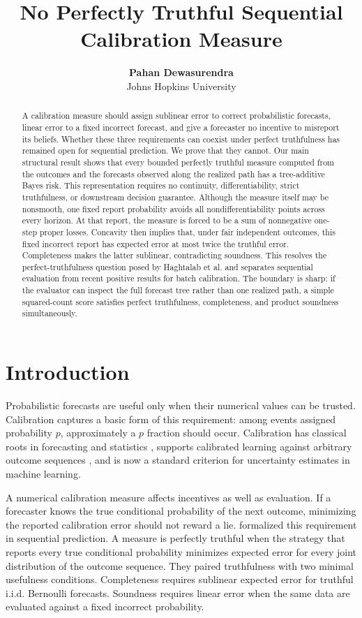 \documentclass{article}
\title{No Perfectly Truthful Sequential Calibration Measure}
\author{\textbf{Pahan Dewasurendra} \\ Johns Hopkins University}
\theoremstyle{definition}
\theoremstyle{remark}
\newcommand{\1}{\mathbf 1}
\begin{document}
\maketitle

\begin{abstract}
A calibration measure should assign sublinear error to correct probabilistic forecasts, linear error to a fixed incorrect forecast, and give a forecaster no incentive to misreport its beliefs. Whether these three requirements can coexist under perfect truthfulness has remained open for sequential prediction. We prove that they cannot. Our main structural result shows that every bounded perfectly truthful measure computed from the outcomes and the forecasts observed along the realized path has a tree-additive Bayes risk. This representation requires no continuity, differentiability, strict truthfulness, or downstream decision guarantee. Although the measure itself may be nonsmooth, one fixed report probability avoids all nondifferentiability points across every horizon. At that report, the measure is forced to be a sum of nonnegative one-step proper losses. Concavity then implies that, under fair independent outcomes, this fixed incorrect report has expected error at most twice the truthful error. Completeness makes the latter sublinear, contradicting soundness. This resolves the perfect-truthfulness question posed by Haghtalab et al. and separates sequential evaluation from recent positive results for batch calibration. The boundary is sharp: if the evaluator can inspect the full forecast tree rather than one realized path, a simple squared-count score satisfies perfect truthfulness, completeness, and product soundness simultaneously.
\end{abstract}

\section{Introduction}

Probabilistic forecasts are useful only when their numerical values can be trusted. Calibration captures a basic form of this requirement: among events assigned probability \(p\), approximately a \(p\) fraction should occur. Calibration has classical roots in forecasting and statistics \citep{brier1950verification,dawid1982well}, supports calibrated learning against arbitrary outcome sequences \citep{foster1998asymptotic}, and is now a standard criterion for uncertainty estimates in machine learning.

A numerical calibration measure affects incentives as well as evaluation. If a forecaster knows the true conditional probability of the next outcome, minimizing the reported calibration error should not reward a lie. \citet{haghtalab2024truthfulness} formalized this requirement in sequential prediction. A measure is perfectly truthful when the strategy that reports every true conditional probability minimizes expected error for every joint distribution of the outcome sequence. They paired truthfulness with two minimal usefulness conditions. Completeness requires sublinear expected error for truthful i.i.d. Bernoulli forecasts. Soundness requires linear error when the same data are evaluated against a fixed incorrect probability.
\end{document}
